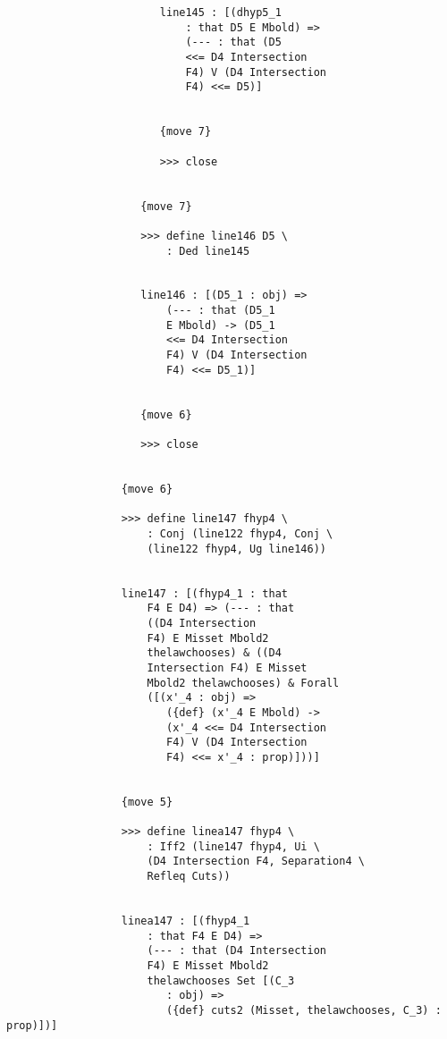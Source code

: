 \documentclass[12pt]{article}
\begin{document}
\begin{verbatim}
                        line145 : [(dhyp5_1 
                            : that D5 E Mbold) => 
                            (--- : that (D5 
                            <<= D4 Intersection 
                            F4) V (D4 Intersection 
                            F4) <<= D5)]


                        {move 7}

                        >>> close


                     {move 7}

                     >>> define line146 D5 \
                         : Ded line145


                     line146 : [(D5_1 : obj) => 
                         (--- : that (D5_1 
                         E Mbold) -> (D5_1 
                         <<= D4 Intersection 
                         F4) V (D4 Intersection 
                         F4) <<= D5_1)]


                     {move 6}

                     >>> close


                  {move 6}

                  >>> define line147 fhyp4 \
                      : Conj (line122 fhyp4, Conj \
                      (line122 fhyp4, Ug line146))


                  line147 : [(fhyp4_1 : that 
                      F4 E D4) => (--- : that 
                      ((D4 Intersection 
                      F4) E Misset Mbold2 
                      thelawchooses) & ((D4 
                      Intersection F4) E Misset 
                      Mbold2 thelawchooses) & Forall 
                      ([(x'_4 : obj) => 
                         ({def} (x'_4 E Mbold) -> 
                         (x'_4 <<= D4 Intersection 
                         F4) V (D4 Intersection 
                         F4) <<= x'_4 : prop)]))]


                  {move 5}

                  >>> define linea147 fhyp4 \
                      : Iff2 (line147 fhyp4, Ui \
                      (D4 Intersection F4, Separation4 \
                      Refleq Cuts))


                  linea147 : [(fhyp4_1 
                      : that F4 E D4) => 
                      (--- : that (D4 Intersection 
                      F4) E Misset Mbold2 
                      thelawchooses Set [(C_3 
                         : obj) => 
                         ({def} cuts2 (Misset, thelawchooses, C_3) : prop)])]



\end{verbatim}
\end{document}
